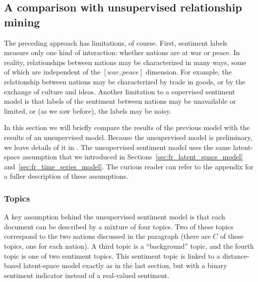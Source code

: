 \subsection*{A comparison with unsupervised relationship mining}


The preceding approach has limitations, of course.  First, sentiment
labels measure only one kind of interaction: whether nations are at
war or peace.  In reality, relationships between nations may be
characterized in many ways, some of which are independent of the $[
war, peace ]$ dimension.  For example, the relationship between
nations may be characterized by trade in goods, or by the exchange of
culture and ideas.  Another limitation to a supervised sentiment model
is that labels of the sentiment between nations may be unavailable
or limited, or (as we saw before), the labels may be noisy.

In this section we will briefly compare the results of the previous
model with the results of an unsupervised model.  Because the
unsupervised model is preliminary, we leave details of it in
.  The unsupervised sentiment model
uses the same latent-space assumption that we introduced in
Sections~\ref{sec:fr_latent_space_model}
and~\ref{sec:fr_time_series_model}.  The curious reader can refer to
the appendix for a fuller description of these assumptions.

\subsubsection*{Topics}
A key assumption behind the unsupervised sentiment model is that each
document can be described by a mixture of four topics.  Two of these
topics correspond to the two nations discussed in the paragraph (there
are $C$ of these topics, one for each nation).  A third topic is a
``background'' topic, and the fourth topic is one of two sentiment
topics.  This sentiment topic is linked to a distance-based
latent-space model exactly as in the last section, but with a binary
sentiment indicator instead of a real-valued sentiment.

